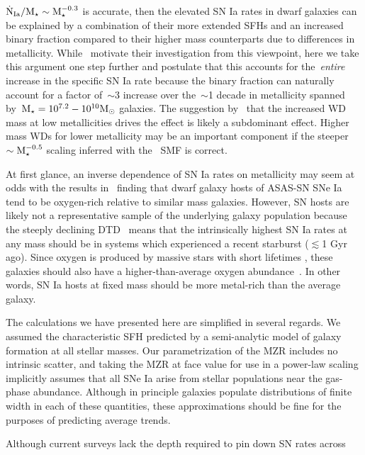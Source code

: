\documentclass[foo.tex]{subfiles}
\begin{document}
$\dot{\text{N}}_\text{Ia} / \text{M}_\star \sim \text{M}_\star^{-0.3}$ is accurate, then the
elevated SN Ia rates in dwarf galaxies can be explained by a combination of
their more extended SFHs and an increased binary fraction compared to their
higher mass counterparts due to differences in metallicity.
While~\citet{Gandhi2022} motivate their investigation from this viewpoint, here
we take this argument one step further and postulate that this accounts for
the~\textit{entire} increase in the specific SN Ia rate because the binary
fraction can naturally account for a factor of~$\sim$3 increase over
the~$\sim$1 decade in metallicity spanned by~$\text{M}_\star = 10^{7.2} - 10^{10}
\text{M}_\odot$ galaxies.
The suggestion by~\citet{Kistler2013} that the increased WD mass at low
metallicities drives the effect is likely a subdominant effect.
Higher mass WDs for lower metallicity may be an important component if the
steeper~$\sim \text{M}_\star^{-0.5}$ scaling inferred with the~\citet{Bell2003} SMF is
correct.
\par
At first glance, an inverse dependence of SN Ia rates on metallicity may seem
at odds with the results in~\citet{Holoien2022} finding that dwarf galaxy
hosts of ASAS-SN SNe Ia tend to be oxygen-rich relative to similar mass
galaxies.
However, SN hosts are likely not a representative sample of the underlying
galaxy population because the steeply declining DTD~\citep[e.g.,][]{Maoz2012a}
means that the intrinsically highest SN Ia rates at any mass should be in
systems which experienced a recent starburst ($\lesssim$1 Gyr ago).
Since oxygen is produced by massive stars with short lifetimes
\citep*[e.g.,][]{Hurley2000, Johnson2019}, these galaxies should also have a
higher-than-average oxygen abundance~\citep[see, e.g.,][]{Johnson2020}.
In other words, SN Ia hosts at fixed mass should be more metal-rich than the
average galaxy.
\par
The calculations we have presented here are simplified in several regards.
We assumed the characteristic SFH predicted by a semi-analytic model of
galaxy formation at all stellar masses.
Our parametrization of the MZR includes no intrinsic scatter, and taking the
\citet{Zahid2014} MZR at face value for use in a power-law scaling implicitly
assumes that all SNe Ia arise from stellar populations near the gas-phase
abundance.
Although in principle galaxies populate distributions of finite width in each
of these quantities, these approximations should be fine for the purposes of
predicting average trends.
\par
Although current surveys lack the depth required to pin down SN rates across
\end{document}
